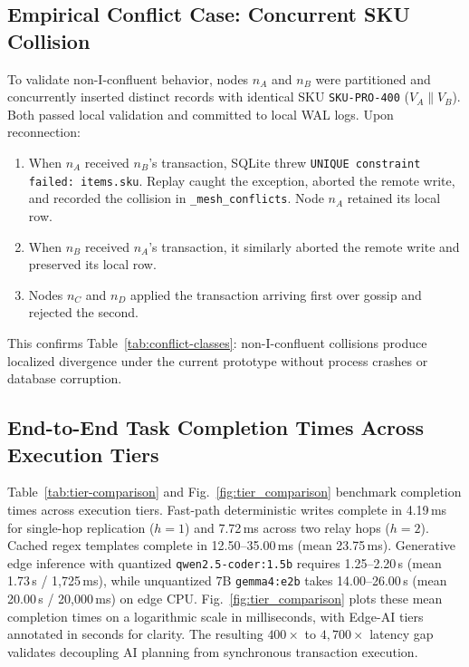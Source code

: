 \subsection{Empirical Conflict Case: Concurrent SKU Collision}
\label{sec:eval-conflict}

To validate non-I-confluent behavior, nodes $n_A$ and $n_B$ were partitioned and concurrently inserted distinct records with identical SKU \texttt{SKU-PRO-400} ($V_A \parallel V_B$). Both passed local validation and committed to local WAL logs. Upon reconnection:
\begin{enumerate}
    \item When $n_A$ received $n_B$'s transaction, SQLite threw \texttt{UNIQUE constraint failed: items.sku}. Replay caught the exception, aborted the remote write, and recorded the collision in \texttt{\_mesh\_conflicts}. Node $n_A$ retained its local row.
    \item When $n_B$ received $n_A$'s transaction, it similarly aborted the remote write and preserved its local row.
    \item Nodes $n_C$ and $n_D$ applied the transaction arriving first over gossip and rejected the second.
\end{enumerate}
This confirms Table~\ref{tab:conflict-classes}: non-I-confluent collisions produce localized divergence under the current prototype without process crashes or database corruption.

\subsection{End-to-End Task Completion Times Across Execution Tiers}
\label{sec:eval-completion}

Table~\ref{tab:tier-comparison} and Fig.~\ref{fig:tier_comparison} benchmark completion times across execution tiers. Fast-path deterministic writes complete in 4.19\,ms for single-hop replication ($h=1$) and 7.72\,ms across two relay hops ($h=2$). Cached regex templates complete in 12.50--35.00\,ms (mean 23.75\,ms). Generative edge inference with quantized \texttt{qwen2.5-coder:1.5b} requires 1.25--2.20\,s (mean 1.73\,s / 1{,}725\,ms), while unquantized 7B \texttt{gemma4:e2b} takes 14.00--26.00\,s (mean 20.00\,s / 20{,}000\,ms) on edge CPU. Fig.~\ref{fig:tier_comparison} plots these mean completion times on a logarithmic scale in milliseconds, with Edge-AI tiers annotated in seconds for clarity. The resulting $400\times$ to $4{,}700\times$ latency gap validates decoupling AI planning from synchronous transaction execution.

